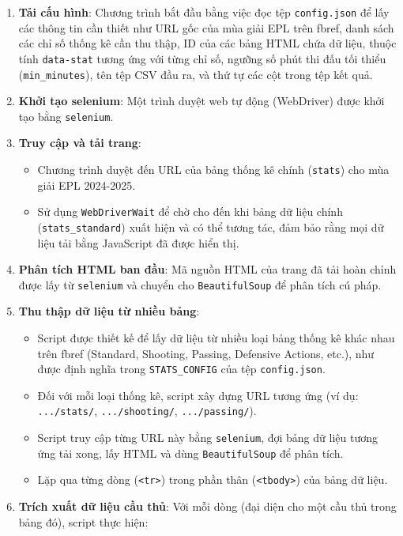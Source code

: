 \documentclass[12pt, a4paper]{report}
\begin{document}
\begin{enumerate}[label=\textbf{Bước \arabic*:}, leftmargin=*]
    \item \textbf{Tải cấu hình}: Chương trình bắt đầu bằng việc đọc tệp \texttt{config.json} để lấy các thông tin cần thiết như URL gốc của mùa giải EPL trên fbref, danh sách các chỉ số thống kê cần thu thập, ID của các bảng HTML chứa dữ liệu, thuộc tính \texttt{data-stat} tương ứng với từng chỉ số, ngưỡng số phút thi đấu tối thiểu (\texttt{min\_minutes}), tên tệp CSV đầu ra, và thứ tự các cột trong tệp kết quả.
    \item \textbf{Khởi tạo selenium}: Một trình duyệt web tự động (WebDriver) được khởi tạo bằng \texttt{selenium}.
    \item \textbf{Truy cập và tải trang}:
    \begin{itemize}[leftmargin=0em]
        \item Chương trình duyệt đến URL của bảng thống kê chính (\texttt{stats}) cho mùa giải EPL 2024-2025. 
        \item Sử dụng \texttt{WebDriverWait} để chờ cho đến khi bảng dữ liệu chính (\texttt{stats\_standard}) xuất hiện và có thể tương tác, đảm bảo rằng mọi dữ liệu tải bằng JavaScript đã được hiển thị. 
    \end{itemize}
    \item \textbf{Phân tích HTML ban đầu}: Mã nguồn HTML của trang đã tải hoàn chỉnh được lấy từ \texttt{selenium} và chuyển cho \texttt{BeautifulSoup} để phân tích cú pháp. 
    \item \textbf{Thu thập dữ liệu từ nhiều bảng}:
    \begin{itemize}[leftmargin=0em]
        \item Script được thiết kế để lấy dữ liệu từ nhiều loại bảng thống kê khác nhau trên fbref (Standard, Shooting, Passing, Defensive Actions, etc.), như được định nghĩa trong \texttt{STATS\_CONFIG} của tệp \texttt{config.json}. 
        \item Đối với mỗi loại thống kê, script xây dựng URL tương ứng (ví dụ: \texttt{.../stats/}, \texttt{.../shooting/}, \texttt{.../passing/}). 
        \item Script truy cập từng URL này bằng \texttt{selenium}, đợi bảng dữ liệu tương ứng tải xong, lấy HTML và dùng \texttt{BeautifulSoup} để phân tích.
        \item Lặp qua từng dòng (\texttt{<tr>}) trong phần thân (\texttt{<tbody>}) của bảng dữ liệu. 
    \end{itemize}
    \item \textbf{Trích xuất dữ liệu cầu thủ}: Với mỗi dòng (đại diện cho một cầu thủ trong bảng đó), script thực hiện: 

\end{enumerate}
\end{document}
